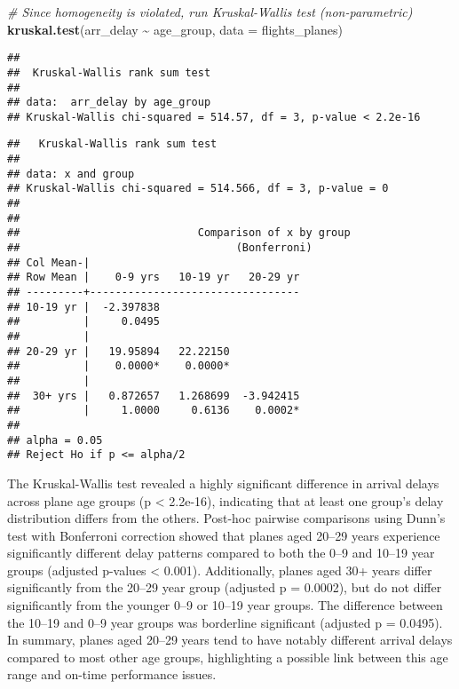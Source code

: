 \documentclass[
]{article}
\newenvironment{Shaded}{\begin{snugshade}}{\end{snugshade}}
\newcommand{\AttributeTok}[1]{\textcolor[rgb]{0.13,0.29,0.53}{#1}}
\newcommand{\CommentTok}[1]{\textcolor[rgb]{0.56,0.35,0.01}{\textit{#1}}}
\newcommand{\FunctionTok}[1]{\textcolor[rgb]{0.13,0.29,0.53}{\textbf{#1}}}
\newcommand{\NormalTok}[1]{#1}
\newcommand{\SpecialCharTok}[1]{\textcolor[rgb]{0.81,0.36,0.00}{\textbf{#1}}}
\newcommand{\StringTok}[1]{\textcolor[rgb]{0.31,0.60,0.02}{#1}}
\begin{document}
\begin{Shaded}
\begin{Highlighting}[]
\CommentTok{\# Since homogeneity is violated, run Kruskal{-}Wallis test (non{-}parametric)}
\FunctionTok{kruskal.test}\NormalTok{(arr\_delay }\SpecialCharTok{\textasciitilde{}}\NormalTok{ age\_group, }\AttributeTok{data =}\NormalTok{ flights\_planes)}
\end{Highlighting}
\end{Shaded}

\begin{verbatim}
## 
##  Kruskal-Wallis rank sum test
## 
## data:  arr_delay by age_group
## Kruskal-Wallis chi-squared = 514.57, df = 3, p-value < 2.2e-16
\end{verbatim}

\begin{Shaded}
\end{Shaded}

\begin{verbatim}
##   Kruskal-Wallis rank sum test
## 
## data: x and group
## Kruskal-Wallis chi-squared = 514.566, df = 3, p-value = 0
## 
## 
##                            Comparison of x by group                            
##                                  (Bonferroni)                                  
## Col Mean-|
## Row Mean |    0-9 yrs   10-19 yr   20-29 yr
## ---------+---------------------------------
## 10-19 yr |  -2.397838
##          |     0.0495
##          |
## 20-29 yr |   19.95894   22.22150
##          |    0.0000*    0.0000*
##          |
##  30+ yrs |   0.872657   1.268699  -3.942415
##          |     1.0000     0.6136    0.0002*
## 
## alpha = 0.05
## Reject Ho if p <= alpha/2
\end{verbatim}

The Kruskal-Wallis test revealed a highly significant difference in
arrival delays across plane age groups (p \textless{} 2.2e-16),
indicating that at least one group's delay distribution differs from the
others. Post-hoc pairwise comparisons using Dunn's test with Bonferroni
correction showed that planes aged 20--29 years experience significantly
different delay patterns compared to both the 0--9 and 10--19 year
groups (adjusted p-values \textless{} 0.001). Additionally, planes aged
30+ years differ significantly from the 20--29 year group (adjusted p =
0.0002), but do not differ significantly from the younger 0--9 or 10--19
year groups. The difference between the 10--19 and 0--9 year groups was
borderline significant (adjusted p = 0.0495). In summary, planes aged
20--29 years tend to have notably different arrival delays compared to
most other age groups, highlighting a possible link between this age
range and on-time performance issues.
\end{document}
